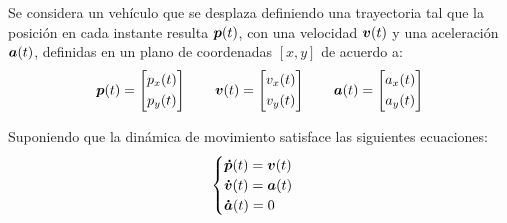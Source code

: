 
	Se considera un vehículo que se desplaza definiendo una trayectoria tal que la posición en cada instante resulta $\boldsymbol{p}(t)$, con una velocidad $\boldsymbol{v}(t)$ y una aceleración $\boldsymbol{a}(t)$, definidas en un plano de coordenadas $[x,y]$ de acuerdo a:
	\begin{equation*}
		\vect{p}(t) = \begin{bmatrix} p_x(t) \\[0.3em] p_y(t) \end{bmatrix} \qquad%
		\vect{v}(t) = \begin{bmatrix} v_x(t) \\[0.3em] v_y(t) \end{bmatrix} \qquad%
		\vect{a}(t) = \begin{bmatrix} a_x(t) \\[0.3em] a_y(t) \end{bmatrix}%
	\end{equation*}

	Suponiendo que la dinámica de movimiento satisface las siguientes ecuaciones:
	\begin{equation*}
		\begin{cases}
			\boldsymbol{\dot{p}}(t) = \boldsymbol{v}(t)\\
			\boldsymbol{\dot{v}}(t) = \boldsymbol{a}(t)\\
			\boldsymbol{\dot{a}}(t) = 0
		\end{cases}
	\end{equation*}

